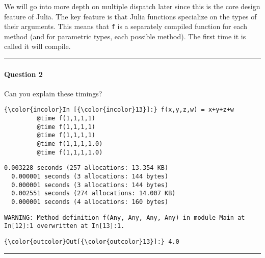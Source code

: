 \documentclass[11pt]{article}
\begin{document}
    We will go into more depth on multiple dispatch later since this is the
core design feature of Julia. The key feature is that Julia functions
specialize on the types of their arguments. This means that \texttt{f}
is a separately compiled function for each method (and for parametric
types, each possible method). The first time it is called it will
compile.

\begin{center}\rule{3in}{0.4pt}\end{center}

\paragraph{Question 2}\label{question-2}

Can you explain these timings?

    \begin{Verbatim}[commandchars=\\\{\}]
{\color{incolor}In [{\color{incolor}13}]:} f(x,y,z,w) = x+y+z+w
         @time f(1,1,1,1)
         @time f(1,1,1,1)
         @time f(1,1,1,1)
         @time f(1,1,1,1.0)
         @time f(1,1,1,1.0)
\end{Verbatim}

    \begin{Verbatim}[commandchars=\\\{\}]
  0.003228 seconds (257 allocations: 13.354 KB)
  0.000001 seconds (3 allocations: 144 bytes)
  0.000001 seconds (3 allocations: 144 bytes)
  0.002551 seconds (274 allocations: 14.007 KB)
  0.000001 seconds (4 allocations: 160 bytes)

    \end{Verbatim}

    \begin{Verbatim}[commandchars=\\\{\}]
WARNING: Method definition f(Any, Any, Any, Any) in module Main at In[12]:1 overwritten at In[13]:1.

    \end{Verbatim}

            \begin{Verbatim}[commandchars=\\\{\}]
{\color{outcolor}Out[{\color{outcolor}13}]:} 4.0
\end{Verbatim}
        
    \begin{center}\rule{3in}{0.4pt}\end{center}
\end{document}

